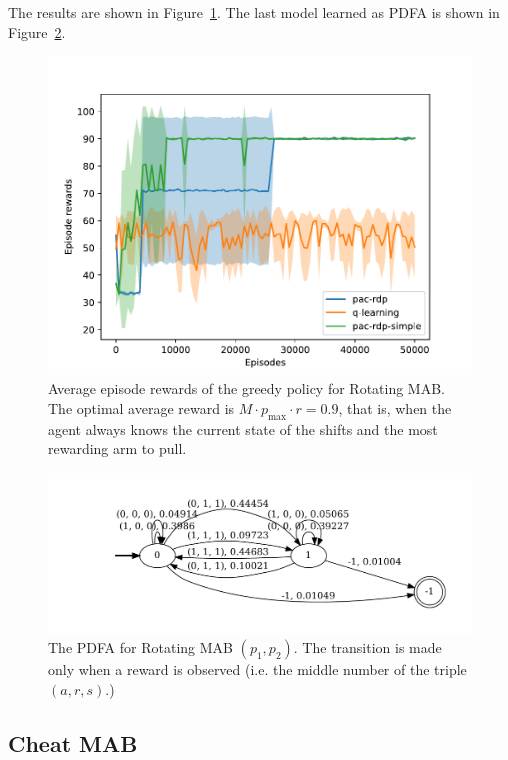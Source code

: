 \documentclass{article}
\begin{document}
The results are shown in Figure~\ref{fig:rotmab-experiment}.
The last model learned as PDFA is shown in Figure~\ref{fig:rotmab-pdfa}.

\begin{figure}[!h]
 \centering
 \includegraphics[width=\linewidth]{plot-rotmab.pdf}
 \caption{Average episode rewards of the greedy policy for Rotating MAB. The optimal average reward
 is $M\cdot p_{\max} \cdot r = 0.9$, that is, when the agent always knows the current state of the
 shifts and the most rewarding arm to pull.}
 \label{fig:rotmab-experiment}
\end{figure}%
\begin{figure}[!h]
 \includegraphics[width=\linewidth]{pdfa-rotmab-02-90-20.pdf}
 \caption{The PDFA for Rotating MAB $(p_1, p_2)$. The
   transition is made only when a reward is observed (i.e. the middle number
 of the triple $(a, r, s)$.)}
 \label{fig:rotmab-pdfa}
\end{figure}

\pagebreak

\subsection{Cheat MAB}
\end{document}
